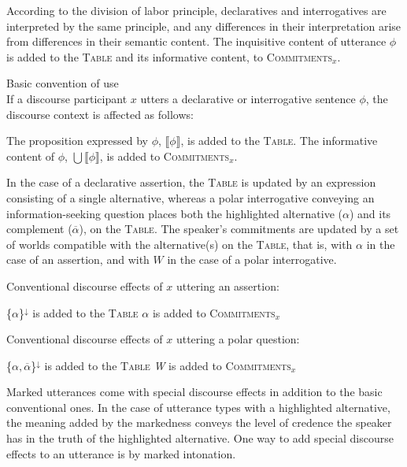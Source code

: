 \documentclass[output=paper,colorlinks,citecolor=brown            ,chinesefont]{langscibook}
\begin{document}
According to the division of labor principle, declaratives and interrogatives are interpreted by the same principle, and any differences in their interpretation arise from differences in their semantic content. The inquisitive content of utterance $\phi$ is added to the \textsc{Table} and its informative content, to \textsc{Commitments}$_x$.

\begin{exe}
\ex\label{Convention} Basic convention of use\\
If a discourse participant $x$ utters a declarative or interrogative sentence $\phi$, the discourse context is affected as follows:
\begin{xlist}
\ex The proposition expressed by $\phi$, $\llbracket\phi\rrbracket$, is added to the \textsc{Table}.
\ex The informative content of $\phi$, $\bigcup \llbracket \phi \rrbracket$, is added to \textsc{Commitments}$_x$.\\ \citep[265]{Farkas+2017}
\end{xlist}
\end{exe}

In the case of a declarative assertion, the \textsc{Table} is updated by an expression consisting of a single alternative, whereas a polar interrogative conveying an information-seeking question places both the highlighted alternative ($\alpha$) and its complement ($\overline{\alpha}$), on the \textsc{Table}. The speaker's commitments are updated by a set of worlds compatible with the alternative(s) on the \textsc{Table}, that is, with $\alpha$ in the case of an assertion, and with $W$ in the case of a polar interrogative. 

\begin{exe}
\ex\label{ConvA} Conventional discourse effects of $x$ uttering an assertion:
\begin{xlist}
\ex\label{ConvA1} \{$\alpha$\}$^\downarrow$ is added to the \textsc{Table} 
\ex\label{ConvA2} $\alpha$ is added to \textsc{Commitments}$_x$ 
\end{xlist}
\ex\label{ConventionPQ} Conventional discourse effects of $x$ uttering a polar question:
\begin{xlist}
\ex \{$\alpha, \overline{\alpha}$\}$^\downarrow$ is added to the \textsc{Table}
\ex \textit{W} is added to \textsc{Commitments}$_x$ \hfill \citep[266--267]{Farkas+2017}
\end{xlist}
\end{exe}


Marked utterances come with special discourse effects in addition to the basic conventional ones. In the case of utterance types with a highlighted alternative, the meaning added by the markedness conveys the level of credence the speaker has in the truth of the highlighted alternative. One way to add special discourse effects to an utterance is by marked intonation.  
\end{document}
